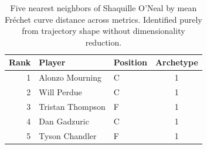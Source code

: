 \begin{table}[htbp]
  \centering\small
  \begin{tabular}{rllc}
    \toprule
    Rank & Player & Position & Archetype \\
    \midrule
    1 & Alonzo Mourning & C & 1 \\
    2 & Will Perdue & C & 1 \\
    3 & Tristan Thompson & F & 1 \\
    4 & Dan Gadzuric & C & 1 \\
    5 & Tyson Chandler & F & 1 \\
    \bottomrule
  \end{tabular}
  \caption{Five nearest neighbors of Shaquille O'Neal by mean Fr\'{e}chet curve distance across metrics. Identified purely from trajectory shape without dimensionality reduction.}
  \label{tab:Shaquille_O_Neal_frechet_curve_neighbors}
\end{table}

